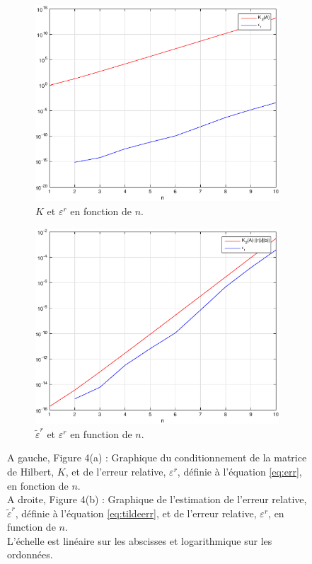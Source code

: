 \begin{enumerate}[label=\alph*)]
\begin{figure}[h!]
  \begin{subfigure}[b]{0.5 \linewidth}
    \centering
    \includegraphics[scale=0.4]{s4/matlab/KVSErr} 
    \caption{$K$ et $\varepsilon^{r}$ en fonction de $n$.} 
    \label{figKAAndErra} 
  \end{subfigure}
  \begin{subfigure}[b]{0.5 \linewidth}
    \centering
    \includegraphics[scale=0.4]{s4/matlab/ErrVSTildeErr} 
    \caption{$\tilde{\varepsilon}^{r}$ et $\varepsilon^{r}$ en function de $n$.} 
    \label{figKAAndErrb} 
  \end{subfigure} 
  \caption{A gauche, Figure 4(a) : Graphique du conditionnement de la matrice de Hilbert, $K$, et de l'erreur relative, $\varepsilon^{r}$, définie à l'équation \eqref{eq:err}, en fonction de $n$. \\
  A droite, Figure 4(b) : Graphique de l'estimation de l'erreur relative, $\tilde{\varepsilon}^{r}$, définie à l'équation \eqref{eq:tildeerr}, et de l'erreur relative, $\varepsilon^{r}$, en function de $n$. \\
  L'échelle est linéaire sur les abscisses et logarithmique sur les ordonnées.}
  \label{figKAAndErr}
\end{figure} 



\end{enumerate}
